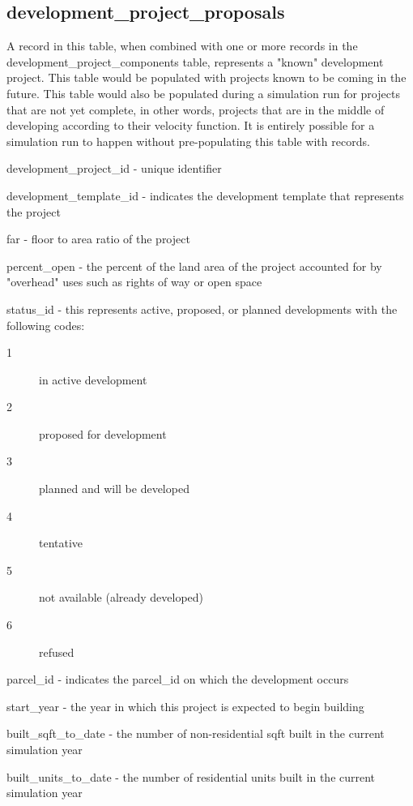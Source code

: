 \subsection{development\_project\_proposals} 

A record in this table, when combined with one or more records in the development\_project\_components table, represents a "known" development project. This table would be populated with projects known to be coming in the future. This table would also be populated during a simulation run for projects that are not yet complete, in other words, projects that are in the middle of developing according to their velocity function. It is entirely possible for a simulation run to happen without pre-populating this table with records.

\begin{description}
\item development\_project\_id - unique identifier
\item development\_template\_id - indicates the development template that represents the project
\item far - floor to area ratio of the project
\item percent\_open - the percent of the land area of the project accounted for by "overhead" uses such as rights of way or open space
\item status\_id - this represents active, proposed, or planned developments with the following codes: 
  \begin{description}
  \item[1] in active development
  \item[2] proposed for development
  \item[3] planned and will be developed
  \item[4] tentative
  \item[5] not available (already developed)
  \item[6]  refused
  \end{description}
\item parcel\_id - indicates the parcel\_id on which the development occurs
\item start\_year - the year in which this project is expected to begin building
\item built\_sqft\_to\_date - the number of non-residential sqft built in the current simulation year
\item built\_units\_to\_date - the number of residential units built in the current simulation year 
\end{description}

